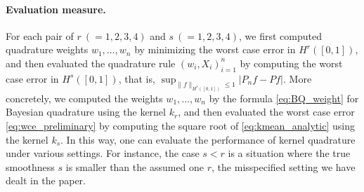 \documentclass[11pt]{article}
\theoremstyle{remark}
\theoremstyle{example}
\theoremstyle{remark}
\begin{document}
\begin{comment}
\begin{eqnarray*}
f_1(x) &=& \phi_{1,0} ( |x - 1/2|/ \epsilon ), \\
f_2(x) &=& \phi_{1,1} ( |x - 1/2|/ \epsilon ), \\
f_3(x) &=& \phi_{1,2} ( |x - 1/2|/ \epsilon ), \\
f_4(x) &=& \phi_{1,2} ( |x - 1/2|/ \epsilon ). 
\end{eqnarray*}
\end{comment}

\paragraph{Evaluation measure.}
For each pair of  $r\ (= 1,2,3,4)$ and $s\ (= 1,2,3,4)$, we first computed quadrature weights $w_1,\dots,w_n$ by minimizing the worst case error in $H^r([0,1])$, and then evaluated the quadrature rule $(w_i,X_i)_{i=1}^n$ by computing the worst case error in $H^s([0,1])$, that is, $\sup_{\| f \|_{H^s([0,1])} \leq 1} |P_n f- Pf|$.
More concretely, we computed the weights $w_1,\dots,w_n$ by the formula \eqref{eq:BQ_weight} for Bayesian quadrature using the kernel $k_r$, and then evaluated the worst case error \eqref{eq:wce_preliminary} by computing the square root of \eqref{eq:kmean_analytic} using the kernel $k_s$.
In this way, one can evaluate the performance of kernel quadrature under various settings.
For instance, the case $s < r$ is a situation where the true smoothness $s$ is smaller than the assumed one $r$, the misspecified setting we have dealt in the paper.





\begin{comment}
\begin{eqnarray*}
f_s(x) &=& 1 + \frac{ (-1)^{s-1} (2\pi)^{2s} }{ (2s)! } B_{2s} (  x  ),\quad x \in [0,1], \\
\end{eqnarray*}
where $B_{2s}$ denotes the $2s$-th Bernoulli polynomial. 
This function can be written as 
$$
f_s(x) = 1 + \sum_{i=1}^\infty \frac{1}{i^{2s}} \sqrt{2} \cos (2\pi i x),
$$
which shows that $f_s$ is periodic on $[0,1]$ and $s$ determines the smoothness of $f_s$; in fact $f_s$ belongs to $W_2^s[0,1]$.
More explicitly, for $x \in [0,1]$, 
\begin{eqnarray*}
f_1(x) &=& 1 + 2\pi^2 \left( x^2 - x + \frac{1}{6} \right) \\
f_2(x) &=& 1 + \frac{2\pi^4}{3} \left( -x^4 + 2x^3 -x^2 + \frac{1}{30} \right) \\
f_3(x) &=& 1 + \frac{4 \pi^6}{45} \left( x^6 - 3 x^5 + \frac{5}{2} x^4 - \frac{1}{2} x^2 + \frac{1}{42} \right) \\
f_4(x) &=& 1 + \frac{2 \pi^8}{ 315 } \left( - x^8 + 4 x^7 -\frac{14}{3} x^6 + \frac{7}{3} x^4 - \frac{2}{3} x^2 + \frac{1}{30} \right)
\end{eqnarray*}
\end{comment}
\end{document}
